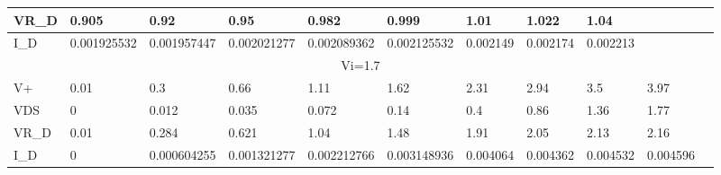 \begin{table}[h]
{\begin{tabular}{|lllllllllll|}
\multicolumn{1}{|l|}{VR\_D} & \multicolumn{1}{l|}{0.905}       & \multicolumn{1}{l|}{0.92}        & \multicolumn{1}{l|}{0.95}        & \multicolumn{1}{l|}{0.982}       & \multicolumn{1}{l|}{0.999}       & \multicolumn{1}{l|}{1.01}     & \multicolumn{1}{l|}{1.022}    & \multicolumn{1}{l|}{1.04}     & \multicolumn{1}{l|}{}         &          \\ \hline
\multicolumn{1}{|l|}{I\_D}  & \multicolumn{1}{l|}{0.001925532} & \multicolumn{1}{l|}{0.001957447} & \multicolumn{1}{l|}{0.002021277} & \multicolumn{1}{l|}{0.002089362} & \multicolumn{1}{l|}{0.002125532} & \multicolumn{1}{l|}{0.002149} & \multicolumn{1}{l|}{0.002174} & \multicolumn{1}{l|}{0.002213} & \multicolumn{1}{l|}{}         &          \\ \hline
\multicolumn{11}{|c|}{Vi=1.7}                                                                                                                                                                                                                                                                                                                         \\ \hline
\multicolumn{1}{|l|}{V+}    & \multicolumn{1}{l|}{0.01}        & \multicolumn{1}{l|}{0.3}         & \multicolumn{1}{l|}{0.66}        & \multicolumn{1}{l|}{1.11}        & \multicolumn{1}{l|}{1.62}        & \multicolumn{1}{l|}{2.31}     & \multicolumn{1}{l|}{2.94}     & \multicolumn{1}{l|}{3.5}      & \multicolumn{1}{l|}{3.97}     &          \\ \hline
\multicolumn{1}{|l|}{VDS}   & \multicolumn{1}{l|}{0}           & \multicolumn{1}{l|}{0.012}       & \multicolumn{1}{l|}{0.035}       & \multicolumn{1}{l|}{0.072}       & \multicolumn{1}{l|}{0.14}        & \multicolumn{1}{l|}{0.4}      & \multicolumn{1}{l|}{0.86}     & \multicolumn{1}{l|}{1.36}     & \multicolumn{1}{l|}{1.77}     &          \\ \hline
\multicolumn{1}{|l|}{VR\_D} & \multicolumn{1}{l|}{0.01}        & \multicolumn{1}{l|}{0.284}       & \multicolumn{1}{l|}{0.621}       & \multicolumn{1}{l|}{1.04}        & \multicolumn{1}{l|}{1.48}        & \multicolumn{1}{l|}{1.91}     & \multicolumn{1}{l|}{2.05}     & \multicolumn{1}{l|}{2.13}     & \multicolumn{1}{l|}{2.16}     &          \\ \hline
\multicolumn{1}{|l|}{I\_D}  & \multicolumn{1}{l|}{0}           & \multicolumn{1}{l|}{0.000604255} & \multicolumn{1}{l|}{0.001321277} & \multicolumn{1}{l|}{0.002212766} & \multicolumn{1}{l|}{0.003148936} & \multicolumn{1}{l|}{0.004064} & \multicolumn{1}{l|}{0.004362} & \multicolumn{1}{l|}{0.004532} & \multicolumn{1}{l|}{0.004596} &          \\ \hline

\end{tabular}}
\end{table}
